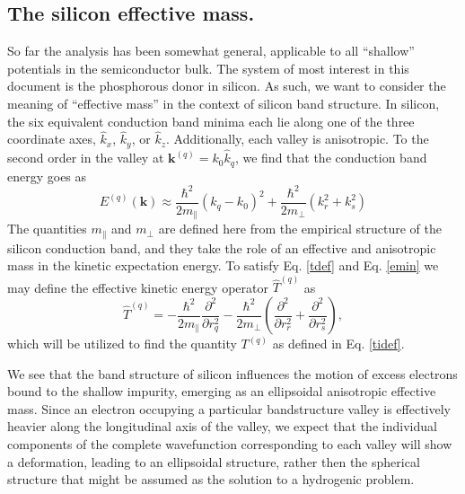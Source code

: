 %
%
%
%

\subsection{The silicon effective mass.}
So far the analysis has been somewhat general, applicable to all
``shallow'' potentials in the semiconductor bulk. The system of most
interest in this document is the phosphorous donor in silicon. As
such, we want to consider the meaning of ``effective mass'' in the
context of silicon band structure. In silicon, the six equivalent
conduction band minima each lie along one of the three coordinate
axes, $\hat{k}_x$, $\hat{k}_y$, or $\hat{k}_z$. Additionally, each
valley is anisotropic. To the second order in the valley at $\bm{k}^{(q)}
= k_0\hat{k}_{q}$, we find that the conduction band energy goes as
\begin{equation}
  E^{(q)}(\bm{k})
  \approx 
  \frac{\hbar^2}{2 m_\parallel}\left(k_q - k_0\right)^2
  + \frac{\hbar^2}{2 m_\perp}\left(k_{r}^2 + k_{s}^2\right)
  \label{emin}
\end{equation}
The quantities $m_{\parallel}$ and $m_{\perp}$ are defined here from
the empirical structure of the silicon conduction band, and they take
the role of an effective and anisotropic mass in the kinetic
expectation energy. To satisfy Eq. \eqref{tdef} and Eq. \eqref{emin}
we may define the effective kinetic energy operator $\hat{T}^{(q)}$ as
\begin{equation}
  \hat{T}^{(q)}
  =
  - \frac{\hbar^2}{2m_\parallel}\frac{\partial^2}{\partial r_{q}^2}
  - \frac{\hbar^2}{2m_\perp}\left(
  \frac{\partial^2}{\partial r_{r}^2}
  + \frac{\partial^2}{\partial r_{s}^2}
  \right),
\end{equation}
which will be utilized to find the quantity $T^{(q)}$ as defined in
Eq. \eqref{tidef}.

We see that the band structure of silicon influences the motion of
excess electrons bound to the shallow impurity, emerging as an
ellipsoidal anisotropic effective mass. Since an electron occupying a
particular bandstructure valley is effectively heavier along the
longitudinal axis of the valley, we expect that the individual
components of the complete wavefunction corresponding to each valley
will show a deformation, leading to an ellipsoidal structure, rather
then the spherical structure that might be assumed as the solution to
a hydrogenic problem.

